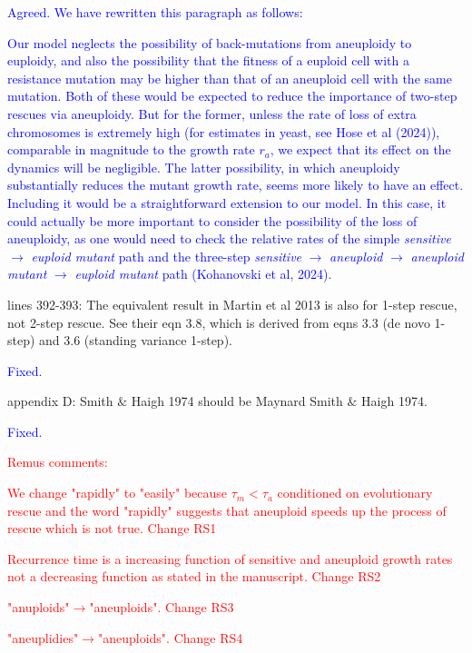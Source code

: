 \documentclass[12pt]{extarticle}
\begin{document}
\textcolor{blue}{Agreed. We have rewritten this paragraph as follows:
\begin{displayquote}
    Our model neglects the possibility of back-mutations from aneuploidy to euploidy, and also the possibility that the fitness of a euploid cell with a resistance mutation may be higher than that of an aneuploid cell with the same mutation. 
    Both of these would be expected to reduce the importance of two-step rescues via aneuploidy.
    But for the former, unless the rate of loss of extra chromosomes is extremely high (for estimates in yeast, see Hose et al (2024)), comparable in magnitude to the growth rate $r_a$, we expect that its effect on the dynamics will be negligible.
    The latter possibility, in which aneuploidy substantially reduces the mutant growth rate, seems more likely
    to have an effect. 
    Including it would be a straightforward extension to our model.
    In this case, it could actually be more important to consider the possibility of the loss of aneuploidy, 
    as one would need to check the relative rates of the simple \textit{sensitive} $\rightarrow$ \textit{euploid mutant} path and the three-step \textit{sensitive} $\rightarrow$ \textit{aneuploid} $\rightarrow$ \textit{aneuploid mutant} $\rightarrow$ \textit{euploid mutant} path (Kohanovski et al, 2024).
\end{displayquote}
}

lines 392-393: The equivalent result in Martin et al 2013 is also for 1-step rescue, not 2-step rescue. See their eqn 3.8, which is derived from eqns 3.3 (de novo 1-step) and 3.6 (standing variance 1-step).

\textcolor{blue}{Fixed.}

appendix D: Smith $\&$ Haigh 1974 should be Maynard Smith $\&$ Haigh 1974.

\textcolor{blue}{Fixed.}

\textcolor{red}{Remus comments:}

\textcolor{red}{We change "rapidly" to "easily" because $\tau_m<\tau_a$ conditioned on evolutionary rescue and the word "rapidly" suggests that aneuploid speeds up the process of rescue which is not true. Change RS1}

\textcolor{red}{Recurrence time is a increasing function of sensitive and aneuploid growth rates not a decreasing function as stated in the manuscript. Change RS2}

\textcolor{red}{"anuploids"$\rightarrow$"aneuploids". Change RS3}

\textcolor{red}{"aneuplidies"$\rightarrow$"aneuploids". Change RS4}
\end{document}
